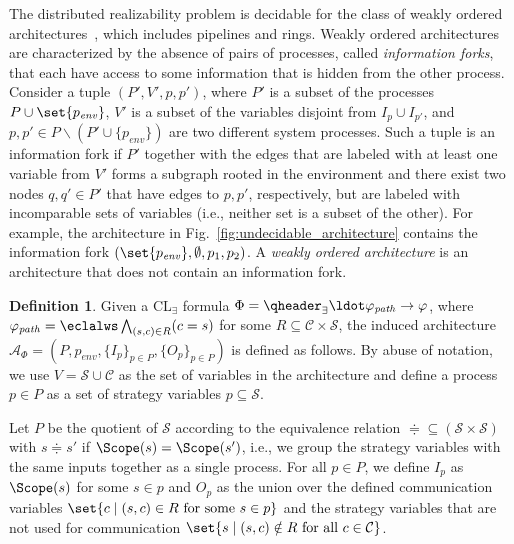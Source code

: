 \documentclass{LMCS}
\theoremstyle{plain}\newtheorem{theorem}[thm]{Theorem}
\theoremstyle{plain}\newtheorem{lemma}[thm]{Lemma}
\theoremstyle{plain}\newtheorem{proposition}[thm]{Proposition}
\theoremstyle{plain}\newtheorem{corollary}[thm]{Corollary}
\theoremstyle{definition}\newtheorem{definition}{Definition}[section]
\begin{document}
The distributed realizability problem is decidable for the class of 
weakly ordered architectures~\cite{DBLP:conf/lics/FinkbeinerS05}, which includes pipelines and rings.
Weakly ordered architectures are characterized by the absence of pairs of processes, called \emph{information forks}, that each have access to some information that is hidden from the other process.
Consider a tuple $(P',V',p,p')$, where $P'$ is a subset of the processes $P \cup \set{p_\mathit{env}}$, $V'$ is a subset of the variables disjoint from $I_p \cup I_{p'}$, and $p,p' \in P \smallsetminus (P' \cup \{ p_\mathit{env} \})$ are two different system processes.
Such a tuple is an information fork if $P'$ together with the edges that are
labeled with at least one variable from $V'$ forms a subgraph rooted in the
environment and there exist two nodes $q,q' \in P'$ that have edges to $p,p'$,
respectively, but are labeled with incomparable sets of variables (i.e.,
neither set is a subset of the other).
For example, the architecture in Fig.~\ref{fig:undecidable_architecture} contains the information fork $(\set{p_\mathit{env}}, \emptyset, p_1, p_2)$.
A \emph{weakly ordered architecture} is an architecture that does not contain an information fork.

\begin{definition} \label{def:induced_architecture}
  Given a CL$_\exists$ formula $\Phi = \qheader_\exists \ldot \varphi_\mathit{path} \rightarrow \varphi$, where $\varphi_\mathit{path} = \eclalws \bigwedge_{(s,c) \in R} (c = s)$ for some $R \subseteq \mathcal{C} \times \mathcal{S}$, the induced architecture $\mathcal{A}_\Phi = (P,p_\mathit{env},\{I_p\}_{p \in P}, \{O_p\}_{p \in P})$ is defined as follows.
  By abuse of notation, we use $V = \mathcal{S} \cup \mathcal{C}$ as the set of variables in the architecture and define a process $p \in P$ as a set of strategy variables $p \subseteq \mathcal{S}$.
  
  Let $P$ be the quotient of $\mathcal{S}$ according to the equivalence relation $\doteqdot{} \subseteq (\mathcal{S} \times \mathcal{S})$ with $s \doteqdot s'$ if $\Scope(s) = \Scope(s')$, i.e., we group the strategy variables with the same inputs together as a single process.
  For all $p \in P$, we define $I_p$ as $\Scope(s)$ for some $s \in p$ and $O_p$ as the union over the defined communication variables $\set{ c \mid (s,c) \in R \text{ for some } s \in p }$ and the strategy variables that are not used for communication $\set{s \mid (s,c) \notin R \text{ for all } c \in \mathcal{C}}$.
\end{definition}
\end{document}

